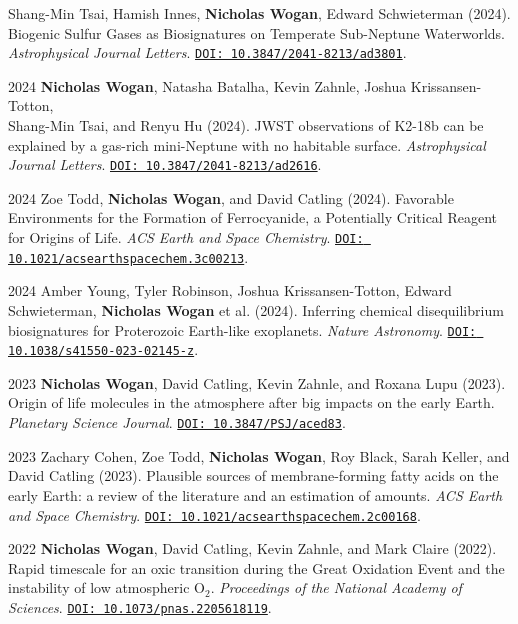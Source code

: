 \documentclass[12pt]{article}
\begin{document}
\begin{cvlist}
  Shang-Min Tsai, Hamish Innes, \textbf{Nicholas Wogan}, Edward Schwieterman (2024). Biogenic Sulfur Gases as Biosignatures on Temperate Sub-Neptune Waterworlds. \emph{Astrophysical Journal Letters}. \href{https://doi.org/10.3847/2041-8213/ad3801}{\nolinkurl{DOI: 10.3847/2041-8213/ad3801}}.
\item[2024]
  \textbf{Nicholas Wogan}, Natasha Batalha, Kevin Zahnle, Joshua Krissansen-Totton, \\Shang-Min Tsai, and Renyu Hu (2024). JWST observations of K2-18b can be explained by a gas-rich mini-Neptune with no habitable surface. \emph{Astrophysical Journal Letters}. \href{https://doi.org/10.3847/2041-8213/ad2616}{\nolinkurl{DOI: 10.3847/2041-8213/ad2616}}.
\item[2024]
  Zoe Todd, \textbf{Nicholas Wogan}, and David Catling (2024). Favorable Environments for the Formation of Ferrocyanide, a Potentially Critical Reagent for Origins of Life. \emph{ACS Earth and Space Chemistry}. \href{https://doi.org/10.1021/acsearthspacechem.3c00213}{\nolinkurl{DOI: 10.1021/acsearthspacechem.3c00213}}.
\item[2024]
  Amber Young, Tyler Robinson, Joshua Krissansen-Totton, Edward Schwieterman, \textbf{Nicholas Wogan} et al. (2024). Inferring chemical disequilibrium biosignatures for Proterozoic Earth-like exoplanets. \emph{Nature Astronomy}. \href{https://doi.org/10.1038/s41550-023-02145-z}{\nolinkurl{DOI: 10.1038/s41550-023-02145-z}}.
\item[2023]
  \textbf{Nicholas Wogan}, David Catling, Kevin Zahnle, and Roxana Lupu (2023). Origin of life molecules in the atmosphere after big impacts on the early Earth. \emph{Planetary Science Journal}. \href{https://doi.org/10.3847/PSJ/aced83}{\nolinkurl{DOI: 10.3847/PSJ/aced83}}.
\item[2023]
  Zachary Cohen, Zoe Todd, \textbf{Nicholas Wogan}, Roy Black, Sarah Keller, and David Catling (2023). Plausible sources of membrane-forming fatty acids on the early Earth: a review of the literature and an estimation of amounts. \emph{ACS Earth and Space Chemistry}. \href{https://doi.org/10.1021/acsearthspacechem.2c00168}{\nolinkurl{DOI: 10.1021/acsearthspacechem.2c00168}}.
\item[2022]
  \textbf{Nicholas Wogan}, David Catling, Kevin Zahnle, and Mark Claire (2022). Rapid timescale for an oxic transition during the Great Oxidation Event and the instability of low atmospheric O$_2$. \emph{Proceedings of the National Academy of Sciences}. \href{https://doi.org/10.1073/pnas.2205618119}{\nolinkurl{DOI: 10.1073/pnas.2205618119}}.

\end{cvlist}
\end{document}

